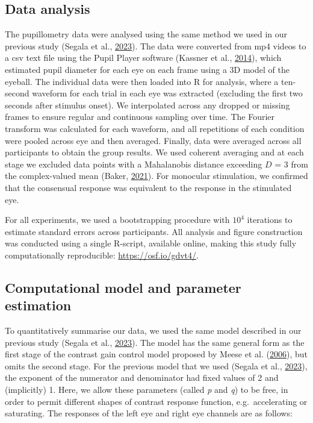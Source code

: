 \documentclass[
]{article}
\begin{document}
\hypertarget{data-analysis}{%
\subsection{Data analysis}\label{data-analysis}}

The pupillometry data were analysed using the same method we used in our previous study (Segala et al., \protect\hyperlink{ref-Segala2023}{2023}). The data were converted from mp4 videos to a csv text file using the Pupil Player software (Kassner et al., \protect\hyperlink{ref-Kassner2014}{2014}), which estimated pupil diameter for each eye on each frame using a 3D model of the eyeball. The individual data were then loaded into R for analysis, where a ten-second waveform for each trial in each eye was extracted (excluding the first two seconds after stimulus onset). We interpolated across any dropped or missing frames to ensure regular and continuous sampling over time. The Fourier transform was calculated for each waveform, and all repetitions of each condition were pooled across eye and then averaged. Finally, data were averaged across all participants to obtain the group results. We used coherent averaging and at each stage we excluded data points with a Mahalanobis distance exceeding \(D\) = 3 from the complex-valued mean (Baker, \protect\hyperlink{ref-Baker2021}{2021}). For monocular stimulation, we confirmed that the consensual response was equivalent to the response in the stimulated eye.

For all experiments, we used a bootstrapping procedure with \ensuremath{10^{4}} iterations to estimate standard errors across participants. All analysis and figure construction was conducted using a single R-script, available online, making this study fully computationally reproducible: \url{https://osf.io/gdvt4/}.

\hypertarget{computational-model-and-parameter-estimation}{%
\subsection{Computational model and parameter estimation}\label{computational-model-and-parameter-estimation}}

To quantitatively summarise our data, we used the same model described in our previous study (Segala et al., \protect\hyperlink{ref-Segala2023}{2023}). The model has the same general form as the first stage of the contrast gain control model proposed by Meese et al. (\protect\hyperlink{ref-Meese2006}{2006}), but omits the second stage. For the previous model that we used (Segala et al., \protect\hyperlink{ref-Segala2023}{2023}), the exponent of the numerator and denominator had fixed values of 2 and (implicitly) 1. Here, we allow these parameters (called \emph{p} and \emph{q}) to be free, in order to permit different shapes of contrast response function, e.g.~accelerating or saturating. The responses of the left eye and right eye channels are as follows:
\end{document}
